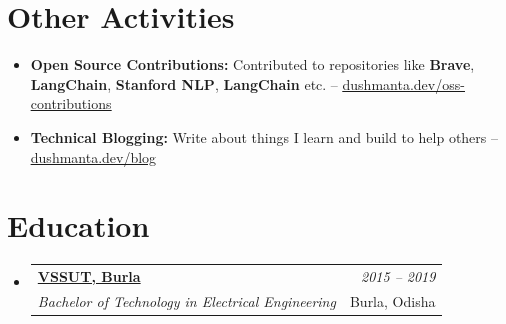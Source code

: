 \documentclass[a4paper,11pt]{article}
\makeatletter
\newcommand{\resumeItem}[1]{
  \item\small{{#1 \vspace{-2pt}}}
}
\newcommand{\resumeSubheading}[4]{
  \vspace{2pt}\item
    \begin{tabular*}{0.97\textwidth}[t]{l@{\extracolsep{\fill}}r}
      \textbf{#1} & {\small \textit{#4}} \\   %
      {\small \textit{\normalsize #3}} & {\small #2} \\   %
    \end{tabular*}\vspace{-8pt}
}
\newcommand{\resumeSubHeadingListStart}{\begin{itemize}[leftmargin=0.15in, label={}]}
\newcommand{\resumeSubHeadingListEnd}{\end{itemize}}
\newcommand{\resumeItemListStart}{\begin{itemize}}
\newcommand{\resumeItemListEnd}{\end{itemize}\vspace{-5pt}}
\makeatother
\begin{document}
\section{Other Activities}
\resumeItemListStart
    \resumeItem{\textbf{Open Source Contributions:} Contributed to repositories like \textbf{Brave}, \textbf{LangChain}, \textbf{Stanford NLP}, \textbf{LangChain} etc. -- \href{https://dushmanta.dev/oss-contributions}{\underline{dushmanta.dev/oss-contributions}}}
    \resumeItem{\textbf{Technical Blogging:} Write about things I learn and build to help others -- \href{https://dushmanta.dev/blog}{\underline{dushmanta.dev/blog}}}
\resumeItemListEnd

\section{Education}
\resumeSubHeadingListStart
 \resumeSubheading
    {\href{https://vssut.ac.in}{VSSUT, Burla}}{Burla, Odisha}
    {Bachelor of Technology in Electrical Engineering}{2015 -- 2019}
\resumeSubHeadingListEnd

\end{document}
